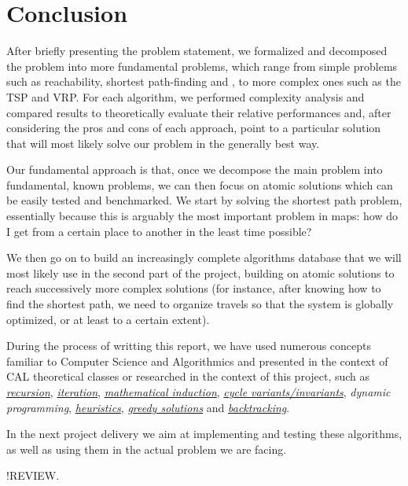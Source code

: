 \chapter{Conclusion} \label{conclusion}
After briefly presenting the problem statement, we formalized and decomposed the problem into more fundamental problems, which range from simple problems such as reachability, shortest path-finding and , to more complex ones such as the \acrshort{TSP} and \acrshort{VRP}. For each algorithm, we performed complexity analysis and compared results to theoretically evaluate their relative performances and, after considering the pros and cons of each approach, point to a particular solution that will most likely solve our problem in the generally best way.\par
Our fundamental approach is that, once we decompose the main problem into fundamental, known problems, we can then focus on atomic solutions which can be easily tested and benchmarked. We start by solving the shortest path problem, essentially because this is arguably the most important problem in maps: how do I get from a certain place to another in the least time possible?\par
We then go on to build an increasingly complete algorithms database that we will most likely use in the second part of the project, building on atomic solutions to reach successively more complex solutions (for instance, after knowing how to find the shortest path, we need to organize travels so that the system is globally optimized, or at least to a certain extent).\par
During the process of writting this report, we have used numerous concepts familiar to Computer Science and Algorithmics and presented in the context of CAL theoretical classes or researched in the context of this project, such as \emph{\hyperref[glsentry-recursive]{recursion}}, \emph{\hyperref[glsentry-iterative]{iteration}}, \emph{\hyperref[teor:dfs]{mathematical induction}}, \emph{\hyperref[sec:dijkstra-PoC]{cycle variants/invariants}}, \emph{\gls{dynamic programming}}, \emph{\hyperref[glsentry-heuristic]{heuristics}}, \emph{\hyperref[glsentry-greedy]{greedy solutions}} and \emph{\hyperref[algorithm-reachability-dfs]{backtracking}}.\par
In the next project delivery we aim at implementing and testing these algorithms, as well as using them in the actual problem we are facing.\par
!REVIEW.
